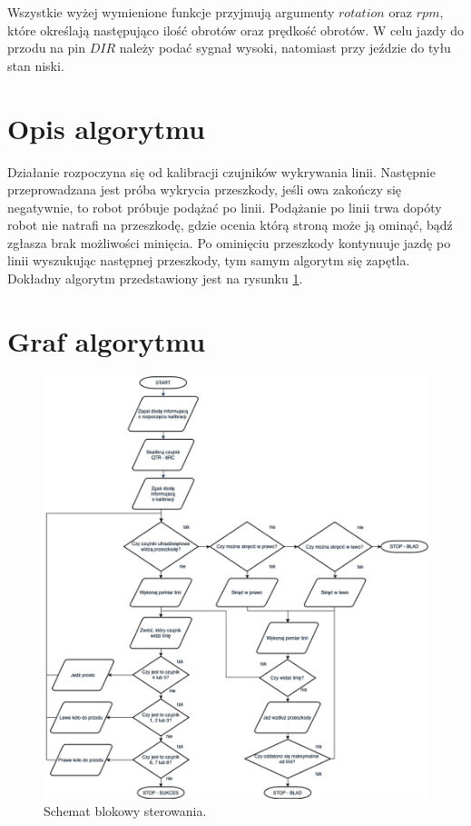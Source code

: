 Wszystkie wyżej wymienione funkcje przyjmują argumenty $rotation$ oraz $rpm$, które określają następująco ilość obrotów oraz prędkość obrotów.
W celu jazdy do przodu na pin $DIR$ należy podać sygnał wysoki, natomiast przy jeździe do tyłu stan niski.

\section{Opis algorytmu}
Działanie rozpoczyna się od kalibracji czujników wykrywania linii. Następnie przeprowadzana jest próba wykrycia przeszkody, jeśli owa zakończy się negatywnie, to robot próbuje podążać po linii. Podążanie po linii trwa dopóty robot nie natrafi na przeszkodę, gdzie ocenia którą stroną może ją ominąć, bądź zgłasza brak możliwości minięcia. Po ominięciu przeszkody kontynuuje jazdę po linii wyszukując następnej przeszkody, tym samym algorytm się zapętla. Dokładny algorytm przedstawiony jest na rysunku \ref{fig:schemat_blokowy}.
\section{Graf algorytmu}
\begin{figure}[H]
\centering
\includegraphics[width=\textwidth]{inzynierku/img/diagram}
\caption{\label{fig:schemat_blokowy}Schemat blokowy sterowania.}
\end{figure}